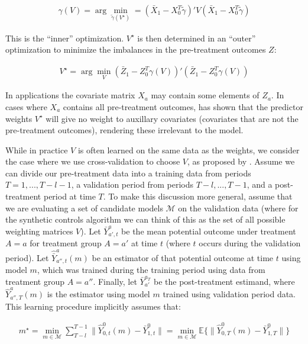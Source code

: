 \documentclass[article]{imsart}
\theoremstyle{plain}
\theoremstyle{remark}
\begin{document}
\begin{align}
\gamma(V) = \arg\min_{\tilde{\gamma}(V^\star)} = (\bar{X}_1 - X_0^T\tilde{\gamma})'V(\bar{X}_1 - X_0^T\tilde{\gamma}) 
\end{align}

This is the ``inner'' optimization. $V^\star$ is then determined in an ``outer'' optimization to minimize the imbalances in the pre-treatment outcomes $Z$:

\begin{align}
    V^\star = \arg\min_V (\bar{Z}_1 - Z_0^T\gamma(V))'(\bar{Z}_1 - Z_0^T\gamma(V))
\end{align}

In applications the covariate matrix $X_a$ may contain some elements of $Z_a$. In cases where $X_a$ contains all pre-treatment outcomes, \cite{kaul2015synthetic} has shown that the predictor weights $V^\star$ will give no weight to auxillary covariates (covariates that are not the pre-treatment outcomes), rendering these irrelevant to the model. 

While in practice $V$ is often learned on the same data as the weights, we consider the case where we use cross-validation to choose $V$, as proposed by \cite{abadie2015comparative}. Assume we can divide our pre-treatment data into a training data from periods $T = 1, ..., T - l - 1$, a validation period from periods $T - l, ..., T - 1$, and a post-treatment period at time $T$. To make this discussion more general, assume that we are evaluating a set of candidate models $\mathcal{M}$ on the validation data (where for the synthetic controls algorithm we can think of this as the set of all possible weighting matrices $V$). Let $\bar{Y}^a_{a', t}$ 
be the mean potential outcome under treatment $A = a$ for treatment group $A = a'$ at time $t$ (where $t$ occurs during the validation period). Let $\hat{\bar{Y}}^a_{a'', t}(m)$ be an estimator of that potential outcome at time $t$ using model $m$, which was trained during the training period using data from treatment group $A = a''$. Finally, let $\bar{Y}_{a'}^{a_T}$ be the post-treatment estimand, where $\hat{Y}^a_{a'', T}(m)$ is the estimator using model $m$ trained using validation period data. This learning procedure implicitly assumes that:

\begin{align*}
m^\star = \min_{m \in \mathcal{M}}\sum_{T - l}^{T-1}\|\hat{Y}^0_{0, t}(m) - \bar{Y}^0_{1, t}\| = \min_{m \in \mathcal{M}}\mathbb{E}\{\|\hat{Y}^0_{0, T}(m) - \bar{Y}^0_{1, T}\|\}
\end{align*}
\end{document}
